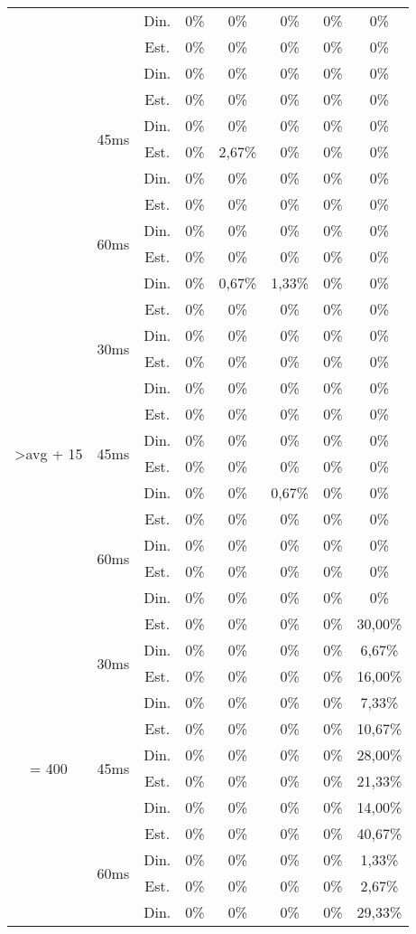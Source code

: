 \begin{center}
\begin{longtable}{|c|c|c|ccccc|}
 &  & Din. &0\% &0\% &0\% &0\% &0\% \\
 &  & Est. &0\% &0\% &0\% &0\% &0\% \\
 &  & Din. &0\% &0\% &0\% &0\% &0\% \\ \cline{2-8} 
 & \multirow{4}{*}{45ms} & Est. &0\% &0\% &0\% &0\% &0\% \\
 &  & Din. &0\% &0\% &0\% &0\% &0\% \\
 &  & Est. &0\% & 2,67\% &0\% &0\% &0\% \\
 &  & Din. &0\% &0\% &0\% &0\% &0\% \\ \cline{2-8} 
 & \multirow{4}{*}{60ms} & Est. &0\% &0\% &0\% &0\% &0\% \\
 &  & Din. &0\% &0\% &0\% &0\% &0\% \\
 &  & Est. &0\% &0\% &0\% &0\% &0\% \\
 &  & Din. &0\% & 0,67\% & 1,33\% &0\% &0\% \\ \hline
\multirow{12}{*}{\textgreater avg + 15} & \multirow{4}{*}{30ms} & Est. &0\% &0\% &0\% &0\% &0\% \\
 &  & Din. &0\% &0\% &0\% &0\% &0\% \\
 &  & Est. &0\% &0\% &0\% &0\% &0\% \\
 &  & Din. &0\% &0\% &0\% &0\% &0\% \\ \cline{2-8} 
 & \multirow{4}{*}{45ms} & Est. &0\% &0\% &0\% &0\% &0\% \\
 &  & Din. &0\% &0\% &0\% &0\% &0\% \\
 &  & Est. &0\% &0\% &0\% &0\% &0\% \\
 &  & Din. &0\% &0\% & 0,67\% &0\% &0\% \\ \cline{2-8} 
 & \multirow{4}{*}{60ms} & Est. &0\% &0\% &0\% &0\% &0\% \\
 &  & Din. &0\% &0\% &0\% &0\% &0\% \\
 &  & Est. &0\% &0\% &0\% &0\% &0\% \\
 &  & Din. &0\% &0\% &0\% &0\% &0\% \\ \hline
\multirow{12}{*}{= 400} & \multirow{4}{*}{30ms} & Est. &0\% &0\% &0\% &0\% & 30,00\% \\
 &  & Din. &0\% &0\% &0\% &0\% & 6,67\% \\
 &  & Est. &0\% &0\% &0\% &0\% & 16,00\% \\
 &  & Din. &0\% &0\% &0\% &0\% & 7,33\% \\ \cline{2-8} 
 & \multirow{4}{*}{45ms} & Est. &0\% &0\% &0\% &0\% & 10,67\% \\
 &  & Din. &0\% &0\% &0\% &0\% & 28,00\% \\
 &  & Est. &0\% &0\% &0\% &0\% & 21,33\% \\
 &  & Din. &0\% &0\% &0\% &0\% & 14,00\% \\ \cline{2-8} 
 & \multirow{4}{*}{60ms} & Est. &0\% &0\% &0\% &0\% & 40,67\% \\
 &  & Din. &0\% &0\% &0\% &0\% & 1,33\% \\
 &  & Est. &0\% &0\% &0\% &0\% & 2,67\% \\
 &  & Din. &0\% &0\% &0\% &0\% & 29,33\% \\ \hline
\end{longtable}
\end{center}

